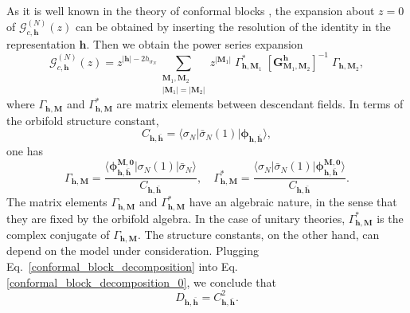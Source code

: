 \documentclass[a4paper,11pt]{article}
\begin{document}
As it is well known in the theory of conformal blocks \cite{DiFrancesco}, the expansion about $z=0$ of $\mathcal{G}_{c, \boldsymbol{h}}^{(N)}(z)$ can be obtained by inserting the resolution of the identity in the representation $\boldsymbol{h}$. Then we obtain the power series expansion
\begin{equation}\label{conformal_block_decomposition}
 \mathcal{G}_{c,\boldsymbol{h}}^{(N)}(z)=
 z^{|\boldsymbol{h}|-2h_{\sigma_N}}\sum_{\substack{\boldsymbol{M}_1, \boldsymbol{M}_2 \\ |\boldsymbol{M}_1|=|\boldsymbol{M}_2|} } z^{|\boldsymbol{M}_1|}\;\Gamma^{*}_{\boldsymbol{h}, \boldsymbol{M}_1}\; [\boldsymbol{G}^{\boldsymbol{h}}_{\boldsymbol{M}_1,\boldsymbol{M}_2}]^{-1}\;\Gamma_{\boldsymbol{h},\boldsymbol{M}_2},
\end{equation}
where $\Gamma_{\boldsymbol{h},\boldsymbol{M}}$ and $\Gamma^{*}_{\boldsymbol{h},\boldsymbol{M}}$ are matrix elements between descendant fields. In terms of the orbifold structure constant,
\begin{equation}
\label{strucconst}
C_{\boldsymbol{h},\boldsymbol{\bar{h}}}=\langle  \sigma_{N}|\bar{\sigma}_{N}(1)|\boldsymbol{\phi}_{\boldsymbol{h},\boldsymbol{\bar{h}}}\rangle,
\end{equation}
one has
 \begin{equation}
 \label{Gammas}
\Gamma_{\boldsymbol{h},\boldsymbol{M}} = \frac{\langle \boldsymbol{\phi}^{\boldsymbol{M},\boldsymbol{0}}_{\boldsymbol{h},\boldsymbol{\bar{h}}}| \sigma_{N}(1)|\bar{\sigma}_{N}\rangle}{C_{\boldsymbol{h},\boldsymbol{\bar{h}}}},\quad  \Gamma^{*}_{\boldsymbol{h},\boldsymbol{M}} = \frac{\langle  \sigma_{N}|\bar{\sigma}_{N}(1)|\boldsymbol{\phi}^{\boldsymbol{M},\boldsymbol{0}}_{\boldsymbol{h},\boldsymbol{\bar{h}}}\rangle}{C_{\boldsymbol{h},\boldsymbol{\bar{h}}}} .
 \end{equation}
 The matrix elements  $\Gamma_{\boldsymbol{h},\boldsymbol{M}}$ and $\Gamma^{*}_{\boldsymbol{h},\boldsymbol{M}}$ have an algebraic nature, in the sense that they are fixed by the orbifold algebra. In the case of unitary theories, $\Gamma^{*}_{\boldsymbol{h}, \boldsymbol{M}}$ is the complex conjugate of $\Gamma_{\boldsymbol{h}, \boldsymbol{M}}$. The structure constants, on the other hand, can depend on the model under consideration. Plugging Eq.~\eqref{conformal_block_decomposition} into Eq.\eqref{conformal_block_decomposition_0}, we conclude that 
 \begin{equation}\label{DC}
 D_{\boldsymbol{h},\boldsymbol{\bar{h}}}= C_{\boldsymbol{h},\boldsymbol{\bar{h}}}^2.
 \end{equation}
\end{document}
